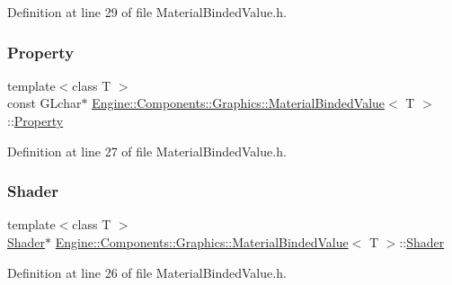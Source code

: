 Definition at line 29 of file Material\+Binded\+Value.\+h.

\mbox{\label{classEngine_1_1Components_1_1Graphics_1_1MaterialBindedValue_aa538707c0eb31482fdb7e06926404b47}} 
\subsubsection{\texorpdfstring{Property}{Property}}
{\footnotesize\ttfamily template$<$class T $>$ \\
const G\+Lchar$\ast$ \mbox{\hyperlink{classEngine_1_1Components_1_1Graphics_1_1MaterialBindedValue}{Engine\+::\+Components\+::\+Graphics\+::\+Material\+Binded\+Value}}$<$ T $>$\+::\mbox{\hyperlink{classProperty}{Property}}}



Definition at line 27 of file Material\+Binded\+Value.\+h.

\mbox{\label{classEngine_1_1Components_1_1Graphics_1_1MaterialBindedValue_a2c069aa41aebee61554ce21b54a08ec8}} 
\subsubsection{\texorpdfstring{Shader}{Shader}}
{\footnotesize\ttfamily template$<$class T $>$ \\
\mbox{\hyperlink{classEngine_1_1Components_1_1Graphics_1_1Shader}{Shader}}$\ast$ \mbox{\hyperlink{classEngine_1_1Components_1_1Graphics_1_1MaterialBindedValue}{Engine\+::\+Components\+::\+Graphics\+::\+Material\+Binded\+Value}}$<$ T $>$\+::\mbox{\hyperlink{classEngine_1_1Components_1_1Graphics_1_1Shader}{Shader}}}



Definition at line 26 of file Material\+Binded\+Value.\+h.

